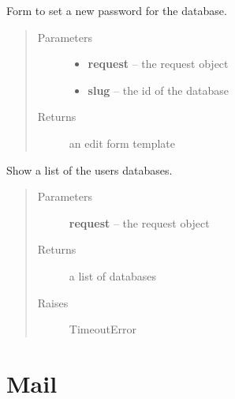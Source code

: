 \documentclass[letterpaper,10pt,english]{sphinxmanual}
\begin{document}

\begin{fulllineitems}
\label{api/mysql:limeade.mysql.views.db_edit}
Form to set a new password for the database.
\begin{quote}\begin{description}
\item[{Parameters}] \leavevmode\begin{itemize}
\item {} 
\textbf{request} -- the request object

\item {} 
\textbf{slug} -- the id of the database

\end{itemize}

\item[{Returns}] \leavevmode
an edit form template

\end{description}\end{quote}

\end{fulllineitems}


\begin{fulllineitems}
\label{api/mysql:limeade.mysql.views.db_list}
Show a list of the users databases.
\begin{quote}\begin{description}
\item[{Parameters}] \leavevmode
\textbf{request} -- the request object

\item[{Returns}] \leavevmode
a list of databases

\item[{Raises }] \leavevmode
TimeoutError

\end{description}\end{quote}

\end{fulllineitems}



\section{Mail}
\label{api/mail:mail}\label{api/mail::doc}
\end{document}
